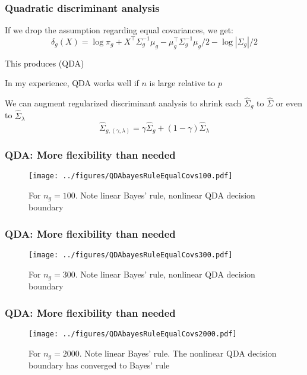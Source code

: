 \documentclass[12pt]{beamer}
\begin{document}
\begin{frame}
\frametitle{Quadratic discriminant analysis}
If we drop the assumption regarding equal covariances, we get:
\[
\delta_g(X) = \log \pi_g + X^{\top} \Sigma_g^{-1}\mu_g  - \mu_{g}^{\top} \Sigma_g^{-1} \mu_g /2 - \log | \Sigma_g|/2
\]
\vsp

This produces  (QDA)

\vsp
In my experience, QDA works well if $n$ is large relative to $p$

\vsp

We can augment regularized discriminant analysis to shrink each $\hat{\Sigma}_g$ to $\hat{\Sigma}$ or even to 
$\hat{\Sigma}_\lambda$
\[
\hat{\Sigma}_{g,(\gamma,\lambda)}  = \gamma\hat{\Sigma}_g + (1-\gamma)\hat{\Sigma}_{\lambda}
\]
\end{frame}




\begin{frame}[fragile]
\frametitle{QDA: More flexibility than needed}
\begin{figure}
\centering
\texttt{[image: ../figures/QDAbayesRuleEqualCovs100.pdf]}
\caption{For $n_g = 100$. Note linear Bayes' rule, nonlinear QDA decision boundary}
\end{figure}
\end{frame}


\begin{frame}[fragile]
\frametitle{QDA: More flexibility than needed}
\begin{figure}
\centering
\texttt{[image: ../figures/QDAbayesRuleEqualCovs300.pdf]}
\caption{For $n_g = 300$. Note linear Bayes' rule, nonlinear QDA decision boundary}
\end{figure}
\end{frame}

\begin{frame}[fragile]
\frametitle{QDA: More flexibility than needed}
\begin{figure}
\centering
\texttt{[image: ../figures/QDAbayesRuleEqualCovs2000.pdf]}
\caption{For $n_g = 2000$. Note linear Bayes' rule. The nonlinear QDA decision boundary has converged to Bayes' rule}
\end{figure}
\end{frame}
\end{document}
